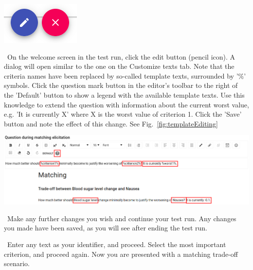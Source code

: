 \documentclass[00_mcda_tutorial.tex]{subfiles}
\begin{document}
\begin{sidebar*}
{	
	\centering
	\includegraphics[width=.3\textwidth]{fig/surveyEditControls.png}
	\label{fig:survey_edit_controls}
	\par
}

\noindent \leftpointright \, On the welcome screen in the test run, click the edit button (pencil icon). A dialog will open similar to the one on the Customize texts tab. Note that the criteria names have been replaced by so-called template texts, surrounded by '\%' symbols. Click the question mark button in the editor's toolbar to the right of the 'Default' button to show a legend with the available template texts. Use this knowledge to extend the question with information about the current worst value, e.g. 'It is currently X' where X is the worst value of criterion 1. Click the 'Save' button and note the effect of this change. See Fig.~\ref{fig:templateEditing}
\newline

{	
	\centering
	\includegraphics[width=\textwidth]{fig/templateStrings.png}
	\label{fig:templateEditing}
	\par
}

\noindent \leftpointright \, Make any further changes you wish and continue your test run. Any changes you made have been saved, as you will see after ending the test run.
\newline

\noindent \leftpointright \, Enter any text as your identifier, and proceed. Select the most important criterion, and proceed again. Now you are presented with a matching trade-off scenario. \newline




\end{sidebar*}
\end{document}
